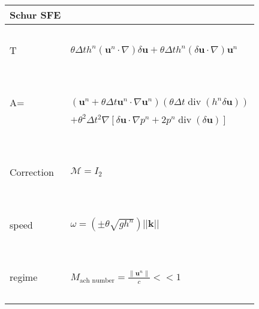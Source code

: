\documentclass[a4paper, 11pt]{report}
\begin{document}
\hspace*{-1.5cm}\begin{minipage}[l]{4cm}
\begin{tiny}
\begin{tabular}{|l|l|}
  \hline
  Schur SFE &  \\
  \hline
  ~ & ~\\
  T &  $\theta\Delta th^n\left(\boldsymbol{u}^n\cdot\nabla\right)\delta \boldsymbol{u}+\theta\Delta th^n\left(\delta \boldsymbol{u} \cdot\nabla\right)\boldsymbol{u}^n$ \\ 
  ~ & ~\\
    \hline
   ~& ~\\ 
  A= &$\left(\boldsymbol{u}^n+\theta \Delta t \boldsymbol{u}^n\cdot \nabla \boldsymbol{u}^n \right)\left(\theta \Delta t \operatorname{div}(h^n \delta \boldsymbol{u})\right) $\\
  ~&$+\theta^2 \Delta t^2 \nabla\left[ \delta \boldsymbol{u}\cdot \nabla p^n + 2p^n \operatorname{div}(\delta \boldsymbol{u}) \right] $\\
  ~ & ~\\
    \hline
     ~ &~ \\
   Correction &  $\mathcal{M}=I_2$ \\ 
   ~ & ~\\
    \hline
     ~ &~ \\
  speed & $\omega=\left(\pm\theta\sqrt{gh^n}\right)||\boldsymbol{k}||$ \\ 
   ~ & ~\\
    \hline
    ~& ~\\
  regime & $M_{\text{ach number}}= \frac{\parallel \boldsymbol{u}^n \parallel }{c}<< 1$\\
   ~& ~\\
    \hline
\end{tabular}
\end{tiny}
\end{minipage}
\end{document}
